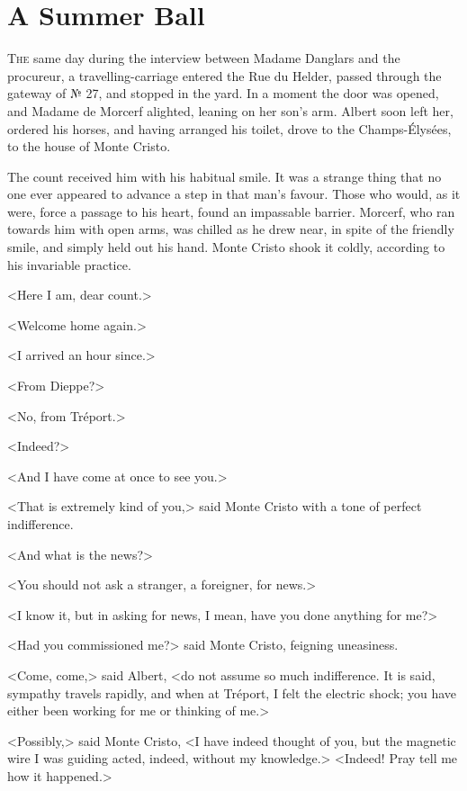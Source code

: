 \chapter{A Summer Ball} 

 \lettrine{T}{he} same day during the interview between Madame Danglars and the procureur, a travelling-carriage entered the Rue du Helder, passed through the gateway of № 27, and stopped in the yard. In a moment the door was opened, and Madame de Morcerf alighted, leaning on her son's arm. Albert soon left her, ordered his horses, and having arranged his toilet, drove to the Champs-Élysées, to the house of Monte Cristo. 

 The count received him with his habitual smile. It was a strange thing that no one ever appeared to advance a step in that man's favour. Those who would, as it were, force a passage to his heart, found an impassable barrier. Morcerf, who ran towards him with open arms, was chilled as he drew near, in spite of the friendly smile, and simply held out his hand. Monte Cristo shook it coldly, according to his invariable practice. 

 <Here I am, dear count.> 

 <Welcome home again.> 

 <I arrived an hour since.> 

 <From Dieppe?> 

 <No, from Tréport.> 

 <Indeed?> 

 <And I have come at once to see you.> 

 <That is extremely kind of you,> said Monte Cristo with a tone of perfect indifference. 

 <And what is the news?> 

 <You should not ask a stranger, a foreigner, for news.> 

 <I know it, but in asking for news, I mean, have you done anything for me?> 

 <Had you commissioned me?> said Monte Cristo, feigning uneasiness. 

 <Come, come,> said Albert, <do not assume so much indifference. It is said, sympathy travels rapidly, and when at Tréport, I felt the electric shock; you have either been working for me or thinking of me.> 

 <Possibly,> said Monte Cristo, <I have indeed thought of you, but the magnetic wire I was guiding acted, indeed, without my knowledge.>  <Indeed! Pray tell me how it happened.> 

